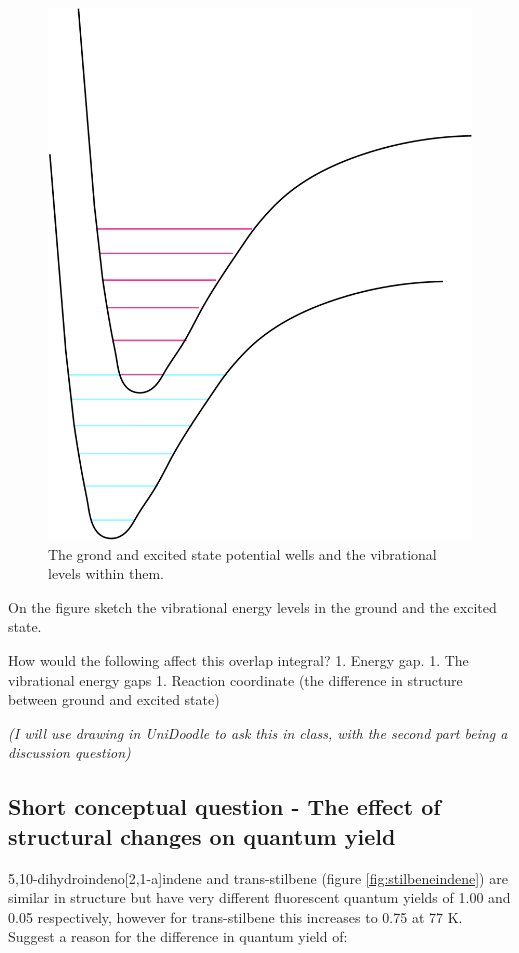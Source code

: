 \documentclass[
]{book}
\begin{document}
\begin{figure}

{\centering \includegraphics[width=0.7\linewidth]{images/overlap} 

}

\caption{The grond and excited state potential wells and the vibrational levels within them.}\label{fig:overlap}
\end{figure}

On the figure sketch the vibrational energy levels in the ground and the excited state.

How would the following affect this overlap integral?
1. Energy gap.
1. The vibrational energy gaps
1. Reaction coordinate (the difference in structure between ground and excited state)

\emph{(I will use drawing in UniDoodle to ask this in class, with the second part being a discussion question)}

\hypertarget{sec:structureQY}{%
\subsection{Short conceptual question - The effect of structural changes on quantum yield}\label{sec:structureQY}}

5,10-dihydroindeno{[}2,1-a{]}indene and trans-stilbene (figure \ref{fig:stilbeneindene}) are similar in structure but have very different fluorescent quantum yields of 1.00 and 0.05 respectively, however for trans-stilbene this increases to 0.75 at 77 K. Suggest a reason for the difference in quantum yield of:
\end{document}
